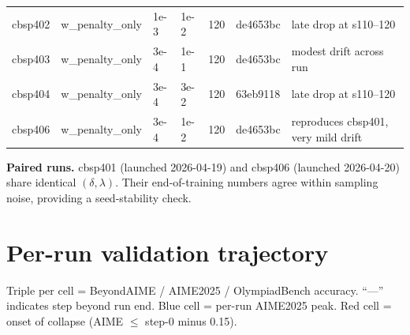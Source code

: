 \documentclass[10pt]{article}
\newcommand{\stable}{\cellcolor{green!20}}
\newcommand{\drift}{\cellcolor{yellow!25}}
\begin{document}
\begin{center}
\begin{tabular}{lllllll}
cbsp402 & w\_penalty\_only   & 1e-3     & 1e-2                    & 120        & de4653bc    & \drift     late drop at s110--120  \\
cbsp403 & w\_penalty\_only   & 3e-4     & 1e-1                    & 120        & de4653bc    & \drift     modest drift across run  \\
cbsp404 & w\_penalty\_only   & 3e-4     & 3e-2                    & 120        & 63eb9118    & \drift     late drop at s110--120  \\
cbsp406 & w\_penalty\_only   & 3e-4     & 1e-2                    & 120        & de4653bc    & \stable    reproduces cbsp401, very mild drift \\
\bottomrule
\end{tabular}
\end{center}

\noindent \textbf{Paired runs.} cbsp401 (launched 2026-04-19) and
cbsp406 (launched 2026-04-20) share identical $(\delta, \lambda)$.
Their end-of-training numbers agree within sampling noise, providing a
seed-stability check.

\section{Per-run validation trajectory}

Triple per cell = BeyondAIME / AIME2025 / OlympiadBench accuracy.
``---'' indicates step beyond run end. Blue cell = per-run AIME2025
peak. Red cell = onset of collapse (AIME $\le$ step-0 minus 0.15).
\end{document}
